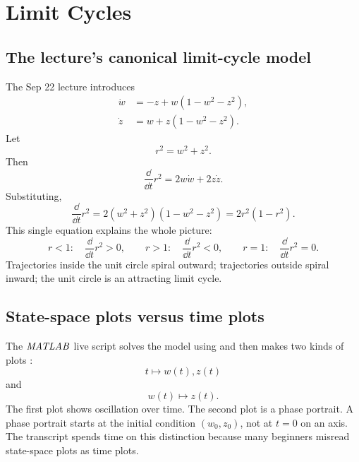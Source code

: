\documentclass[a4paper]{article}
\newcommand{\MATLAB}{\ensuremath{\pksym{MATLAB}}}
\newcommand{\code}[1]{\texttt{\detokenize{#1}}}
\begin{document}
\section{Limit Cycles}

\subsection{The lecture's canonical limit-cycle model}

The Sep 22 lecture introduces
\[
  \begin{aligned}
  \dot w &= -z+w(1-w^2-z^2),\\
  \dot z &= w+z(1-w^2-z^2).
  \end{aligned}
\]
Let
\[
  r^2=w^2+z^2.
\]
Then
\[
  \frac{\dd}{\dd t}r^2
  =
  2w\dot w+2z\dot z.
\]
Substituting,
\[
  \frac{\dd}{\dd t}r^2
  =
  2(w^2+z^2)(1-w^2-z^2)
  =
  2r^2(1-r^2).
\]
This single equation explains the whole picture:
\[
  r<1:\quad \frac{\dd}{\dd t}r^2>0,
  \qquad
  r>1:\quad \frac{\dd}{\dd t}r^2<0,
  \qquad
  r=1:\quad \frac{\dd}{\dd t}r^2=0.
\]
Trajectories inside the unit circle spiral outward; trajectories outside spiral inward; the unit circle is an attracting limit cycle.

\begin{center}
\end{center}

\subsection{State-space plots versus time plots}

The \MATLAB{} live script solves the model using \code{ode15s} and then makes two kinds of plots \cite{bmeg671MatlabNonlinearStability2025}:
\[
  t\mapsto w(t),z(t)
\]
and
\[
  w(t)\mapsto z(t).
\]
The first plot shows oscillation over time. The second plot is a phase portrait. A phase portrait starts at the initial condition \((w_0,z_0)\), not at \(t=0\) on an axis. The transcript spends time on this distinction because many beginners misread state-space plots as time plots.
\end{document}
